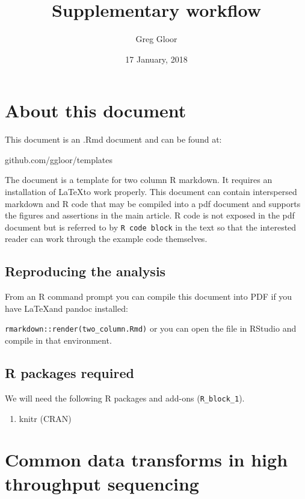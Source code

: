 \documentclass[twocolumn]{article}
\title{Supplementary workflow}
\author{Greg Gloor}
\date{17 January, 2018}
\providecommand{\tightlist}{%
  \setlength{\itemsep}{0pt}\setlength{\parskip}{0pt}}
\begin{document}
\maketitle

{
\hypersetup{linkcolor=black}
\setcounter{tocdepth}{2}
\tableofcontents
}
\section{About this document}\label{about-this-document}

This document is an .Rmd document and can be found at:

github.com/ggloor/templates

The document is a template for two column R markdown. It requires an
installation of \LaTeX to work properly. This document can contain
interspersed markdown and R code that may be compiled into a pdf
document and supports the figures and assertions in the main article. R
code is not exposed in the pdf document but is referred to by
\texttt{R\ code\ block} in the text so that the interested reader can
work through the example code themselves.

\subsection{Reproducing the analysis}\label{reproducing-the-analysis}

From an R command prompt you can compile this document into PDF if you
have \LaTeX and pandoc installed:

\texttt{rmarkdown::render(\textquotesingle{}two\_column.Rmd\textquotesingle{})}
or you can open the file in RStudio and compile in that environment.

\subsection{R packages required}\label{r-packages-required}

We will need the following R packages and add-ons
(\texttt{R\_block\_1}).

\begin{enumerate}
\def\labelenumi{\arabic{enumi}.}
\tightlist
\item
  knitr (CRAN)
\end{enumerate}

\clearpage

\section{Common data transforms in high throughput
sequencing}\label{common-data-transforms-in-high-throughput-sequencing}
\end{document}
